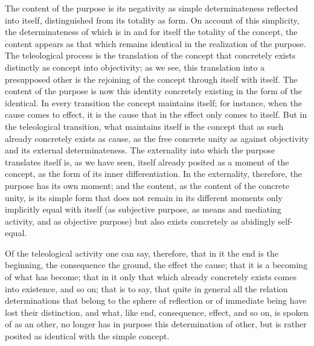 The content of the purpose is its negativity as
simple determinateness reflected into itself,
distinguished from its totality as form.
On account of this simplicity,
the determinateness of which is in and for itself
the totality of the concept,
the content appears as that which remains identical
in the realization of the purpose.
The teleological process is
the translation of the concept
that concretely exists distinctly as
concept into objectivity;
as we see, this translation into
a presupposed other is
the rejoining of the concept
through itself with itself.
The content of the purpose is now
this identity concretely existing
in the form of the identical.
In every transition the concept maintains itself;
for instance, when the cause comes to effect,
it is the cause that in the effect only comes to itself.
But in the teleological transition,
what maintains itself is the concept that as
such already concretely exists as cause,
as the free concrete unity as against
objectivity and its external determinateness.
The externality into which
the purpose translates itself is,
as we have seen, itself already posited as
a moment of the concept,
as the form of its inner differentiation.
In the externality, therefore,
the purpose has its own moment;
and the content, as the content of the concrete unity,
is its simple form that does not
remain in its different moments
only implicitly equal with itself
(as subjective purpose, as means and mediating activity,
and as objective purpose)
but also exists concretely as
abidingly self-equal.

Of the teleological activity
one can say, therefore,
that in it
the end is the beginning,
the consequence the ground,
the effect the cause;
that it is a becoming of what has become;
that in it only that which already
concretely exists comes into existence, and so on;
that is to say, that quite in general
all the relation determinations that belong to
the sphere of reflection or of immediate being
have lost their distinction,
and what, like end, consequence, effect,
and so on, is spoken of as an other,
no longer has in purpose this determination of other,
but is rather posited as identical with the simple concept.

